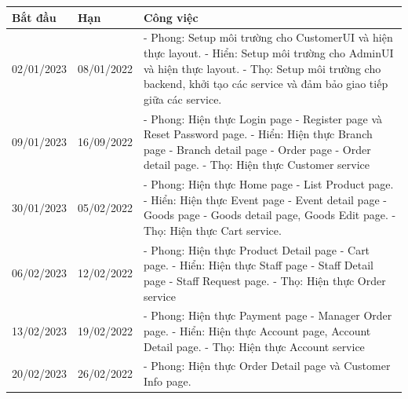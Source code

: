 {
\setlength\extrarowheight{6pt}
\begin{longtable}{| p{2cm} | p{2cm} | p{10cm} |}

    \hline
    \textbf{Bắt đầu} & \textbf{Hạn} & \textbf{Công việc}                                             \\
    \hline
    02/01/2023       & 08/01/2022   &
    - Phong: Setup môi trường cho CustomerUI và hiện thực layout.
    \newline
    - Hiển: Setup môi trường cho AdminUI và hiện thực layout.
    \newline
    - Thọ: Setup môi trường cho backend, khởi tạo các service và đảm bảo giao tiếp giữa các service. \\
    \hline
    09/01/2023       & 16/09/2022   &
    - Phong: Hiện thực Login page - Register page và Reset Password page.
    \newline
    - Hiển: Hiện thực Branch page - Branch detail page - Order page - Order detail page.
    \newline
    - Thọ: Hiện thực Customer service                                                                \\
    \hline
    30/01/2023       & 05/02/2022   &
    - Phong: Hiện thực Home page - List Product page.
    \newline
    - Hiển: Hiện thực Event page - Event detail page - Goods page - Goods detail page, Goods Edit page.
    \newline
    - Thọ: Hiện thực Cart service.                                                                   \\
    \hline
    06/02/2023       & 12/02/2022   &
    - Phong: Hiện thực Product Detail page - Cart page.
    \newline
    - Hiển: Hiện thực Staff page - Staff Detail page - Staff Request page.
    \newline
    - Thọ: Hiện thực Order service                                                                   \\
    \hline
    13/02/2023       & 19/02/2022   &
    - Phong: Hiện thực Payment page - Manager Order page.
    \newline
    - Hiển: Hiện thực Account page, Account Detail page.
    \newline
    - Thọ: Hiện thực Account service                                                                 \\
    \hline
    20/02/2023       & 26/02/2022   &
    - Phong: Hiện thực Order Detail page và Customer Info page.

\end{longtable}}
